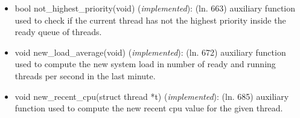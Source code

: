 \documentclass[11pt]{scrartcl}
\begin{document}
\begin{itemize}
	\item bool not\_highest\_priority(void) (\textit{implemented}): \newline
	(ln. 663) auxiliary function used to check if the current thread has not the highest priority inside the ready queue of threads.

	\item void new\_load\_average(void) (\textit{implemented}): \newline
	(ln. 672) auxiliary function used to compute the new system load in number of ready and running threads per second in the last minute.
	
	\item void new\_recent\_cpu(struct thread *t) (\textit{implemented}): \newline
	(ln. 685) auxiliary function used to compute the new recent cpu value for the given thread. 
	

\end{itemize}
\end{document}

